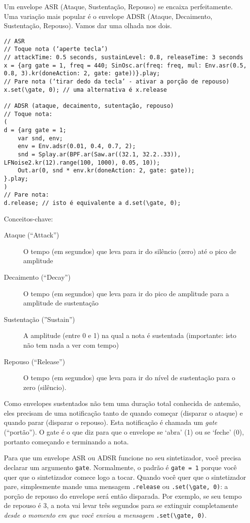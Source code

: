 Um envelope ASR (Ataque, Sustentação, Repouso) se encaixa perfeitamente. Uma variação mais popular é o envelope ADSR (Ataque, Decaimento, Sustentação, Repouso). Vamos dar uma olhada nos dois.

 
\begin{lstlisting}[style=SuperCollider-IDE, basicstyle=\scttfamily\footnotesize]
// ASR
// Toque nota (‘aperte tecla’)
// attackTime: 0.5 seconds, sustainLevel: 0.8, releaseTime: 3 seconds
x = {arg gate = 1, freq = 440; SinOsc.ar(freq: freq, mul: Env.asr(0.5, 0.8, 3).kr(doneAction: 2, gate: gate))}.play;
// Pare nota (‘tirar dedo da tecla’ - ativar a porção de repouso)
x.set(\gate, 0); // uma alternativa é x.release

// ADSR (ataque, decaimento, sutentação, repouso)
// Toque nota:
(
d = {arg gate = 1;
	var snd, env;
	env = Env.adsr(0.01, 0.4, 0.7, 2);
	snd = Splay.ar(BPF.ar(Saw.ar((32.1, 32.2..33)), LFNoise2.kr(12).range(100, 1000), 0.05, 10));
	Out.ar(0, snd * env.kr(doneAction: 2, gate: gate));
}.play;
)
// Pare nota:
d.release; // isto é equivalente a d.set(\gate, 0);
\end{lstlisting}
 
Conceitos-chave:

\begin{description}
\item[Ataque (“Attack”)] O tempo (em segundos) que leva para ir do silêncio (zero) até o pico de amplitude
\item[Decaimento (“Decay”)] O tempo (em segundos) que leva para ir do pico de amplitude para a amplitude de sustentação
\item[Sustentação (”Sustain”)] A amplitude (entre 0 e 1) na qual a nota é sustentada (importante: isto não tem nada a ver com tempo)
\item[Repouso (“Release”)] O tempo (em segundos) que leva para ir do nível de sustentação para o zero (silêncio).
\end{description}

Como envelopes sustentados não tem uma duração total conhecida de antemão, eles precisam de uma notificação tanto de quando começar (disparar o ataque) e quando parar (disparar o repouso). Esta notificação é chamada um \emph{gate} (“portão”). O gate é o que diz para que o envelope se ‘abra’ (1) ou se ‘feche’ (0), portanto começando e terminando a nota.

Para que um envelope ASR ou ADSR funcione no seu sintetizador, você precisa declarar um argumento \texttt{gate}. Normalmente, o padrão é \texttt{gate = 1} porque você quer que o sintetizador comece logo a tocar. Quando você quer que o sintetizador pare, simplesmente mande uma mensagem \texttt{.release} ou \texttt{.set(\textbackslash gate, 0)}: a porção de repouso do envelope será então disparada. Por exemplo, se seu tempo de repouso é 3, a nota vai levar três segundos para se extinguir completamente \emph{desde o momento em que você enviou a mensagem} \texttt{.set(\textbackslash gate, 0)}. 

